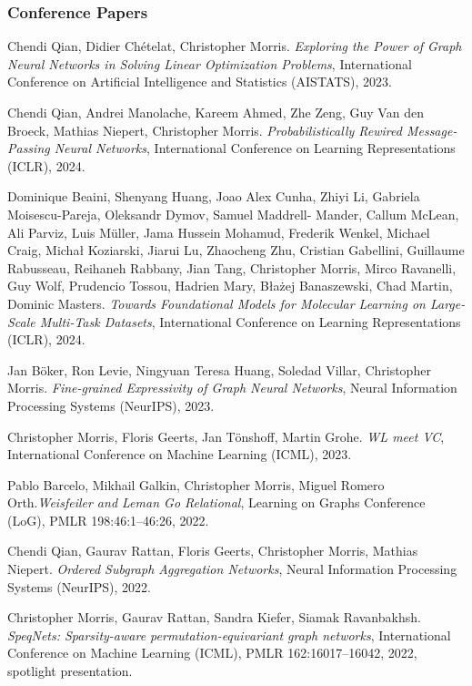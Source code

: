 \documentclass[11pt, a4paper, DIV=14, headings=small]{scrartcl}
\begin{document}
	\begin{thebibliography}{15}
		\subsubsection*{Conference Papers}
		Chendi Qian, Didier Chételat, Christopher Morris.
		\emph{Exploring the Power of Graph Neural Networks in Solving Linear Optimization Problems},
		International Conference on Artificial Intelligence and Statistics (AISTATS), 2023.		
		
		Chendi Qian, Andrei Manolache, Kareem Ahmed, Zhe Zeng, Guy Van den Broeck, Mathias Niepert, Christopher Morris.
		\emph{Probabilistically Rewired Message-Passing Neural Networks}, 
		International Conference on Learning Representations (ICLR), 2024.		
		
		Dominique Beaini, Shenyang Huang, Joao Alex Cunha, Zhiyi Li, Gabriela Moisescu-Pareja, Oleksandr Dymov, Samuel Maddrell-	      Mander, Callum McLean, Ali Parviz, Luis Müller, Jama Hussein Mohamud, Frederik Wenkel, Michael Craig, Michał Koziarski, Jiarui Lu, Zhaocheng Zhu, Cristian Gabellini, Guillaume Rabusseau, Reihaneh Rabbany, Jian Tang, Christopher Morris, Mirco Ravanelli, Guy Wolf, Prudencio Tossou, Hadrien Mary, B\l{}a\.z{}ej Banaszewski, Chad Martin, Dominic Masters.
		\emph{Towards Foundational Models for Molecular Learning on Large-Scale Multi-Task Datasets}, 
		International Conference on Learning Representations (ICLR), 2024.
		
		Jan Böker, Ron Levie, Ningyuan Teresa Huang, Soledad Villar, Christopher Morris.
		\emph{Fine-grained Expressivity of Graph Neural Networks},  
		Neural Information Processing Systems (NeurIPS), 2023.		
		
		Christopher Morris, Floris Geerts, Jan Tönshoff, Martin Grohe.
		\emph{WL meet VC},
		International Conference on Machine Learning (ICML), 2023.
		
		Pablo Barcelo, Mikhail Galkin, Christopher Morris, Miguel Romero Orth.\footnotemark[2]
		\emph{Weisfeiler and Leman Go Relational},
		Learning on Graphs Conference (LoG), PMLR 198:46:1--46:26, 2022.
		
		Chendi Qian, Gaurav Rattan, Floris Geerts, Christopher Morris, Mathias Niepert.
		\emph{Ordered Subgraph Aggregation Networks},
		Neural Information Processing Systems (NeurIPS), 2022.
		
		Christopher Morris, Gaurav Rattan, Sandra Kiefer, Siamak Ravanbakhsh.
		\emph{SpeqNets: Sparsity-aware permutation-equivariant graph networks},
		International Conference on Machine Learning (ICML), PMLR 162:16017--16042, 2022, spotlight presentation.
		

\end{thebibliography}
\end{document}
